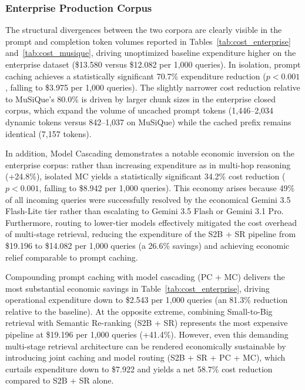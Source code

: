 \subsubsection{Enterprise Production Corpus}
\label{subsubsec:cost_enterprise}

The structural divergences between the two corpora are clearly visible in the prompt and completion token volumes reported in Tables~\ref{tab:cost_enterprise} and~\ref{tab:cost_musique}, driving unoptimized baseline expenditure higher on the enterprise dataset (\$13.580 versus \$12.082 per 1,000 queries). In isolation, prompt caching achieves a statistically significant 70.7\% expenditure reduction ($p < 0.001$, falling to \$3.975 per 1,000 queries). The slightly narrower cost reduction relative to MuSiQue's 80.0\% is driven by larger chunk sizes in the enterprise closed corpus, which expand the volume of uncached prompt tokens (1,446--2,034 dynamic tokens versus 842--1,037 on MuSiQue) while the cached prefix remains identical (7,157 tokens).

In addition, Model Cascading demonstrates a notable economic inversion on the enterprise corpus: rather than increasing expenditure as in multi-hop reasoning (+24.8\%), isolated MC yields a statistically significant 34.2\% cost reduction ($p < 0.001$, falling to \$8.942 per 1,000 queries). This economy arises because 49\% of all incoming queries were successfully resolved by the economical Gemini 3.5 Flash-Lite tier rather than escalating to Gemini 3.5 Flash or Gemini 3.1 Pro. Furthermore, routing to lower-tier models effectively mitigated the cost overhead of multi-stage retrieval, reducing the expenditure of the S2B + SR pipeline from \$19.196 to \$14.082 per 1,000 queries (a 26.6\% savings) and achieving economic relief comparable to prompt caching.



Compounding prompt caching with model cascading (PC + MC) delivers the most substantial economic savings in Table~\ref{tab:cost_enterprise}, driving operational expenditure down to \$2.543 per 1,000 queries (an 81.3\% reduction relative to the baseline). At the opposite extreme, combining Small-to-Big retrieval with Semantic Re-ranking (S2B + SR) represents the most expensive pipeline at \$19.196 per 1,000 queries (+41.4\%). However, even this demanding multi-stage retrieval architecture can be rendered economically sustainable by introducing joint caching and model routing (S2B + SR + PC + MC), which curtails expenditure down to \$7.922 and yields a net 58.7\% cost reduction compared to S2B + SR alone.  

